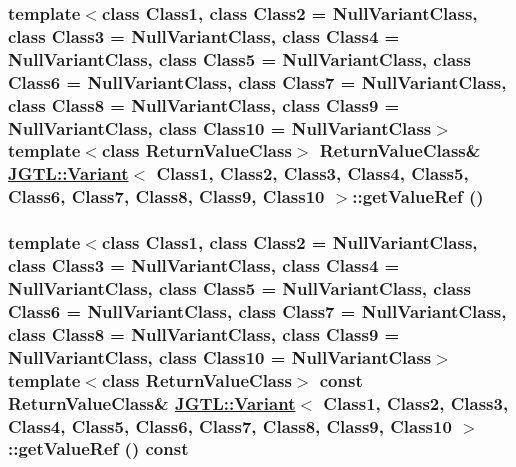 \hypertarget{class_j_g_t_l_1_1_variant_f2670c64307942a4e8f8b363f1adcd5c}{
\subsubsection[getValueRef]{\setlength{\rightskip}{0pt plus 5cm}template$<$class Class1, class Class2 = Null\-Variant\-Class, class Class3 = Null\-Variant\-Class, class Class4 = Null\-Variant\-Class, class Class5 = Null\-Variant\-Class, class Class6 = Null\-Variant\-Class, class Class7 = Null\-Variant\-Class, class Class8 = Null\-Variant\-Class, class Class9 = Null\-Variant\-Class, class Class10 = Null\-Variant\-Class$>$ template$<$class Return\-Value\-Class$>$ Return\-Value\-Class\& \hyperlink{class_j_g_t_l_1_1_variant}{JGTL::Variant}$<$ Class1, Class2, Class3, Class4, Class5, Class6, Class7, Class8, Class9, Class10 $>$::get\-Value\-Ref ()}}
\label{class_j_g_t_l_1_1_variant_f2670c64307942a4e8f8b363f1adcd5c}


\hypertarget{class_j_g_t_l_1_1_variant_7c70b26989ee3f2ba097770da10533c9}{
\subsubsection[getValueRef]{\setlength{\rightskip}{0pt plus 5cm}template$<$class Class1, class Class2 = Null\-Variant\-Class, class Class3 = Null\-Variant\-Class, class Class4 = Null\-Variant\-Class, class Class5 = Null\-Variant\-Class, class Class6 = Null\-Variant\-Class, class Class7 = Null\-Variant\-Class, class Class8 = Null\-Variant\-Class, class Class9 = Null\-Variant\-Class, class Class10 = Null\-Variant\-Class$>$ template$<$class Return\-Value\-Class$>$ const Return\-Value\-Class\& \hyperlink{class_j_g_t_l_1_1_variant}{JGTL::Variant}$<$ Class1, Class2, Class3, Class4, Class5, Class6, Class7, Class8, Class9, Class10 $>$::get\-Value\-Ref () const}}
\label{class_j_g_t_l_1_1_variant_7c70b26989ee3f2ba097770da10533c9}


